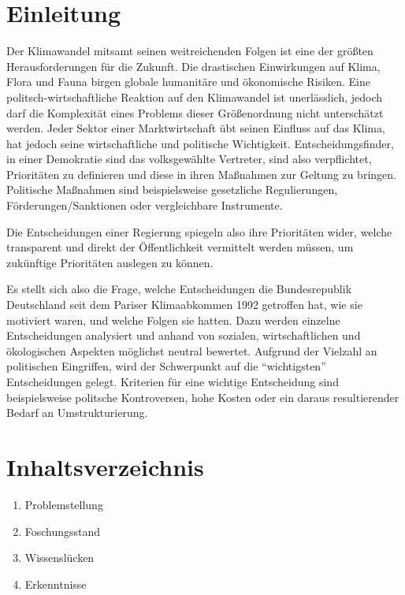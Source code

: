 \documentclass[12pt,a4paper]{article}
\title{\titlename}
\author{ Maylis Grune, Muhamedbaqir Al-Rumeil, Niklas Schmidt}
\date{\exposedate}
\begin{document}


\maketitle

\section*{Einleitung}

Der Klimawandel mitsamt seinen weitreichenden Folgen ist  eine der größten Herausforderungen für die Zukunft. 
Die drastischen Einwirkungen auf Klima, Flora und Fauna \autocite{Consequences:2023}
birgen globale humanitäre und ökonomische Risiken. 
Eine politsch-wirtschaftliche Reaktion auf den Klimawandel ist unerlässlich, 
jedoch darf die Komplexität eines Problems dieser Größenordnung nicht unterschätzt werden. Jeder Sektor einer Marktwirtschaft übt seinen 
Einfluss auf das Klima, hat jedoch seine wirtschaftliche und politische Wichtigkeit. 
Entscheidungsfinder, in einer Demokratie sind das volksgewählte Vertreter, sind also verpflichtet, Prioritäten zu definieren und diese in 
ihren Maßnahmen zur Geltung zu bringen. Politische Maßnahmen sind beispielsweise gesetzliche Regulierungen, Förderungen/Sanktionen oder vergleichbare Instrumente. 

Die Entscheidungen einer Regierung spiegeln also ihre Prioritäten wider, welche transparent und direkt der Öffentlichkeit vermittelt werden müssen, um zukünftige Prioritäten auslegen zu können. 

Es stellt sich also die Frage, welche Entscheidungen die Bundesrepublik Deutschland seit dem Pariser Klimaabkommen 1992 getroffen hat, wie sie motiviert waren, und welche Folgen sie hatten. Dazu werden einzelne Entscheidungen analysiert und anhand von sozialen, wirtschaftlichen und ökologischen Aspekten möglichst neutral bewertet. 
Aufgrund der Vielzahl an politischen Eingriffen, wird der Schwerpunkt auf die “wichtigsten” Entscheidungen gelegt. Kriterien für eine wichtige Entscheidung sind beispielsweise politsche Kontroversen, hohe Kosten oder ein daraus resultierender Bedarf an Umstrukturierung. 

\section*{Inhaltsverzeichnis}
\begin{enumerate}
	\item Problemstellung
	\item Foschungsstand
	\item Wissenslücken
	\item Erkenntnisse
\end{enumerate}
\end{document}
